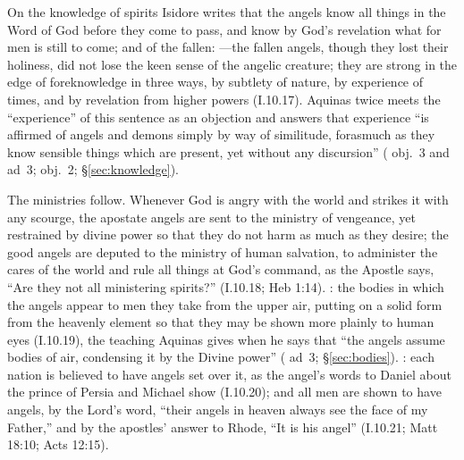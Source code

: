 On the knowledge of spirits Isidore writes that the angels know all things
in the Word of God before they come to pass, and know by God's revelation
what for men is still to come; and of the fallen: ---the fallen angels, though they lost their holiness, did not
lose the keen sense of the angelic creature; they are strong in the edge of
foreknowledge in three ways, by subtlety of nature, by experience of times,
and by revelation from higher powers (I.10.17). Aquinas twice meets the
``experience'' of this sentence as an objection and answers that experience
``is affirmed of angels and demons simply by way of similitude, forasmuch as
they know sensible things which are present, yet without any discursion''
( obj.~3 and ad~3;  obj.~2;
\S\ref{sec:knowledge}).

The ministries follow. Whenever God is angry with the world and strikes it
with any scourge, the apostate angels are sent to the ministry of vengeance,
yet restrained by divine power so that they do not harm as much as they
desire; the good angels are deputed to the ministry of human salvation, to
administer the cares of the world and rule all things at God's command, as
the Apostle says, ``Are they not all ministering spirits?'' (I.10.18; Heb
1:14). : the bodies in which the angels appear to men they take from the
upper air, putting on a solid form from the heavenly element so that they may
be shown more plainly to human eyes (I.10.19), the teaching Aquinas gives
when he says that ``the angels assume bodies of air, condensing it by the
Divine power'' ( ad~3; \S\ref{sec:bodies}). : each nation is believed to
have angels set over it, as the angel's words to Daniel about the prince of
Persia and Michael show (I.10.20); and all men are shown to have angels, by
the Lord's word, ``their angels in heaven always see the face of my Father,''
and by
the apostles' answer to Rhode, ``It is his angel'' (I.10.21; Matt 18:10;
Acts 12:15).

